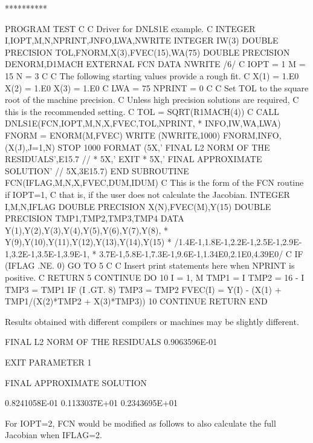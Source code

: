 \documentclass[11pt,twoside,nolof]{starlink}
\begin{document}
\begin{terminalv}
       **********

       PROGRAM TEST
 C
 C     Driver for DNLS1E example.
 C
       INTEGER I,IOPT,M,N,NPRINT,JNFO,LWA,NWRITE
       INTEGER IW(3)
       DOUBLE PRECISION TOL,FNORM,X(3),FVEC(15),WA(75)
       DOUBLE PRECISION DENORM,D1MACH
       EXTERNAL FCN
       DATA NWRITE /6/
 C
       IOPT = 1
       M = 15
       N = 3
 C
 C     The following starting values provide a rough fit.
 C
       X(1) = 1.E0
       X(2) = 1.E0
       X(3) = 1.E0
 C
       LWA = 75
       NPRINT = 0
 C
 C     Set TOL to the square root of the machine precision.
 C     Unless high precision solutions are required,
 C     this is the recommended setting.
 C
       TOL = SQRT(R1MACH(4))
 C
       CALL DNLS1E(FCN,IOPT,M,N,X,FVEC,TOL,NPRINT,
      *            INFO,IW,WA,LWA)
       FNORM = ENORM(M,FVEC)
       WRITE (NWRITE,1000) FNORM,INFO,(X(J),J=1,N)
       STOP
  1000 FORMAT (5X,' FINAL L2 NORM OF THE RESIDUALS',E15.7 //
      *        5X,' EXIT
      *        5X,' FINAL APPROXIMATE SOLUTION' // 5X,3E15.7)
       END
       SUBROUTINE FCN(IFLAG,M,N,X,FVEC,DUM,IDUM)
 C     This is the form of the FCN routine if IOPT=1,
 C     that is, if the user does not calculate the Jacobian.
       INTEGER I,M,N,IFLAG
       DOUBLE PRECISION X(N),FVEC(M),Y(15)
       DOUBLE PRECISION TMP1,TMP2,TMP3,TMP4
       DATA Y(1),Y(2),Y(3),Y(4),Y(5),Y(6),Y(7),Y(8),
      *     Y(9),Y(10),Y(11),Y(12),Y(13),Y(14),Y(15)
      *     /1.4E-1,1.8E-1,2.2E-1,2.5E-1,2.9E-1,3.2E-1,3.5E-1,3.9E-1,
      *      3.7E-1,5.8E-1,7.3E-1,9.6E-1,1.34E0,2.1E0,4.39E0/
 C
       IF (IFLAG .NE. 0) GO TO 5
 C
 C     Insert print statements here when NPRINT is positive.
 C
       RETURN
     5 CONTINUE
       DO 10 I = 1, M
          TMP1 = I
          TMP2 = 16 - I
          TMP3 = TMP1
          IF (I .GT. 8) TMP3 = TMP2
          FVEC(I) = Y(I) - (X(1) + TMP1/(X(2)*TMP2 + X(3)*TMP3))
    10    CONTINUE
       RETURN
       END


       Results obtained with different compilers or machines
       may be slightly different.

       FINAL L2 NORM OF THE RESIDUALS  0.9063596E-01

       EXIT PARAMETER                         1

       FINAL APPROXIMATE SOLUTION

        0.8241058E-01  0.1133037E+01  0.2343695E+01


       For IOPT=2, FCN would be modified as follows to also
       calculate the full Jacobian when IFLAG=2.


\end{terminalv}
\end{document}
